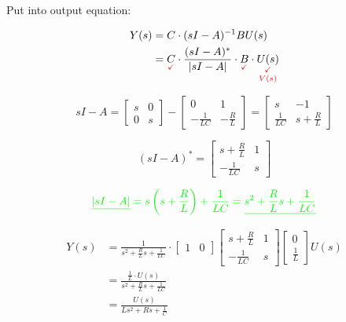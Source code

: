 \documentclass[
  letterpaper,
  DIV=11,
  numbers=noendperiod,
  oneside]{scrreprt}
\begin{document}
Put into output equation:

\begin{align*}
    Y(s) &= C \cdot (sI-A)^{-1} BU(s) \\
    &= \underset{\color{red}\checkmark}{C} \cdot \frac{(sI-A)^{\ast}}{\lvert sI-A \rvert} \cdot \underset{\color{red}\checkmark}{B} \cdot \underset{\color{red}V(s)}{\underset{\color{red}\checkmark}{U(s)}}
\end{align*}

\[sI - A = \begin{bmatrix} s & 0 \\ 0 & s \end{bmatrix} - \begin{bmatrix} 0 & 1 \\ -\displaystyle\frac{1}{LC} & -\displaystyle\frac{R}{L} \end{bmatrix} = \begin{bmatrix} s & -1 \\ \displaystyle\frac{1}{LC} & s+\displaystyle\frac{R}{L} \end{bmatrix}\]

\[(sI - A)^{\ast} = \begin{bmatrix} s+\displaystyle\frac{R}{L} & 1 \\ -\displaystyle\frac{1}{LC} & s \end{bmatrix}\]

\[\color{red}\underline{\color{green}\lvert sI-A \rvert} \color{green} = s\left(s+\frac{R}{L}\right) + \frac{1}{LC} = \color{red}\underline{\color{green} s^2 + \frac{R}{L} s + \frac{1}{LC}}\]

\begin{align*}
    Y(s) &= \frac{1}{\displaystyle s^2+\frac{R}{L}s + \frac{1}{LC}} \cdot \begin{bmatrix} 1 & 0 \end{bmatrix} \begin{bmatrix} s+\displaystyle\frac{R}{L} & 1 \\ -\displaystyle\frac{1}{LC} & s \end{bmatrix} \begin{bmatrix} 0 \\ \displaystyle\frac{1}{L} \end{bmatrix} U(s) \\ 
    &= \frac{\displaystyle\frac{1}{L} \cdot U(s)}{\displaystyle s^2+\frac{R}{L}s + \frac{1}{LC}} \\
    &= \frac{U(s)}{\displaystyle Ls^2 + Rs + \frac{1}{C}}
\end{align*}
\end{document}
